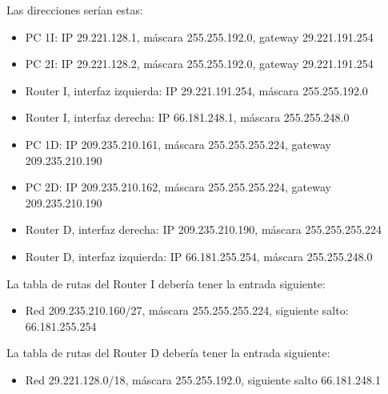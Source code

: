 \documentclass[letterpaper,10pt,spanish]{sphinxmanual}
\begin{document}
\sphinxAtStartPar
Las direcciones serían estas:
\begin{itemize}
\item {} 
\sphinxAtStartPar
PC 1I: IP 29.221.128.1, máscara 255.255.192.0, gateway 29.221.191.254

\item {} 
\sphinxAtStartPar
PC 2I: IP 29.221.128.2, máscara 255.255.192.0, gateway 29.221.191.254

\item {} 
\sphinxAtStartPar
Router I, interfaz izquierda: IP 29.221.191.254, máscara 255.255.192.0

\item {} 
\sphinxAtStartPar
Router I, interfaz derecha: IP 66.181.248.1, máscara 255.255.248.0

\item {} 
\sphinxAtStartPar
PC 1D: IP 209.235.210.161, máscara 255.255.255.224, gateway 209.235.210.190

\item {} 
\sphinxAtStartPar
PC 2D: IP 209.235.210.162, máscara 255.255.255.224, gateway 209.235.210.190

\item {} 
\sphinxAtStartPar
Router D, interfaz derecha: IP 209.235.210.190, máscara 255.255.255.224

\item {} 
\sphinxAtStartPar
Router D, interfaz izquierda: IP 66.181.255.254, máscara 255.255.248.0

\end{itemize}

\sphinxAtStartPar
La tabla de rutas del Router I debería tener la entrada siguiente:
\begin{itemize}
\item {} 
\sphinxAtStartPar
Red 209.235.210.160/27, máscara 255.255.255.224, siguiente salto: 66.181.255.254

\end{itemize}

\sphinxAtStartPar
La tabla de rutas del Router D debería tener la entrada siguiente:
\begin{itemize}
\item {} 
\sphinxAtStartPar
Red 29.221.128.0/18, máscara 255.255.192.0, siguiente salto 66.181.248.1

\end{itemize}
\end{document}
